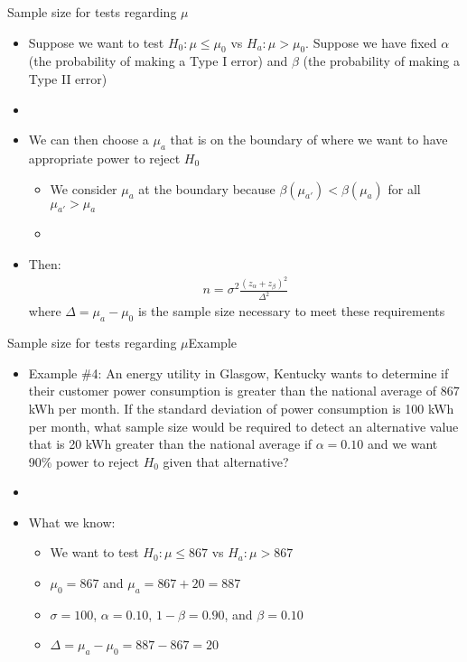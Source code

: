 \documentclass[xcolor=dvipsnames]{beamer}
\begin{document}
\begin{frame}{Sample size for tests regarding $\mu$}
	\begin{itemize}
		\item Suppose we want to test $H_0: \mu \leq \mu_0$ vs $H_a: \mu > \mu_0$. Suppose we have fixed $\alpha$ (the probability of making a Type I error) and $\beta$ (the probability of making a Type II error) \pause
		\item[]
		\item We can then choose a $\mu_a$ that is on the boundary of where we want to have appropriate power to reject $H_0$ \pause
		\begin{itemize}
			\item We consider $\mu_a$ at the boundary because $\beta(\mu_{a'}) < \beta(\mu_a)$ for all $\mu_{a'} > \mu_a$ \pause
			\item[]
		\end{itemize}
	\item Then:
	\begin{gather*}
		n = \sigma^2\frac{(z_{\alpha} + z_{\beta})^2}{\Delta^2}
	\end{gather*}
	where $\Delta = \mu_a - \mu_0 $ is the sample size necessary to meet these requirements
	\end{itemize}
\end{frame}

\begin{frame}{Sample size for tests regarding $\mu$}{Example}
	\begin{itemize}
		\item Example \#4: An energy utility in Glasgow, Kentucky wants to determine if their customer power consumption is greater than the national average of 867 kWh per month. If the standard deviation of power consumption is 100 kWh per month, what sample size would be required to detect an alternative value that is 20 kWh greater than the national average if $\alpha = 0.10$ and we want 90\% power to reject $H_0$ given that alternative? \pause
		\item[]
		\item What we know: \pause
		\begin{itemize}
			\item We want to test $H_0: \mu \leq 867$ vs $H_a: \mu > 867$ \pause
			\item $\mu_0 = 867$ and $\mu_a = 867+20=887$ \pause
			\item $\sigma = 100$, $\alpha = 0.10$, $1-\beta = 0.90$, and $\beta = 0.10$ \pause
			\item $\Delta = \mu_a - \mu_0 = 887-867 = 20$
		\end{itemize}
	\end{itemize}
\end{frame}
\end{document}
